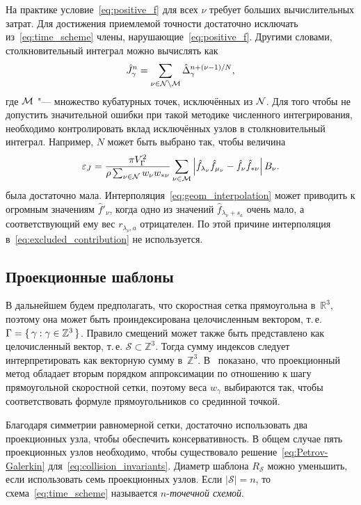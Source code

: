 На практике условие~\eqref{eq:positive_f} для всех \(\nu\) требует больших вычислительных затрат.
Для достижения приемлемой точности достаточно исключать из~\eqref{eq:time_scheme} члены,
нарушающие~\eqref{eq:positive_f}. Другими словами, столкновительный интеграл можно вычислять как
\begin{equation}\label{eq:discrete_short_ci_discarded}
    \hat{J}_\gamma^n = \sum_{\nu\in\mathcal{N}\setminus\mathcal{M}} \hat{\Delta}_\gamma^{n+(\nu-1)/N},
\end{equation}
где \(\mathcal{M}\) "--- множество кубатурных точек, исключённых из \(\mathcal{N}\).
Для того чтобы не допустить значительной ошибки при такой методике численного интегрирования,
необходимо контролировать вклад исключённых узлов в столкновительный интеграл.
Например, \(N\) может быть выбрано так, чтобы величина
\begin{equation}\label{eq:excluded_contribution}
    \varepsilon_J = \frac{\pi V_\Gamma^2}{\rho\sum_{\nu\in\mathcal{N}} w_{\nu}w_{*\nu}}
        \sum_{\nu\in\mathcal{M}} \left|
            \hat{f}_{\lambda_\nu}\hat{f}_{\mu_\nu} - \hat{f}_{\nu}\hat{f}_{*\nu}
        \right|B_\nu.
\end{equation}
была достаточно мала.
Интерполяция~\eqref{eq:geom_interpolation} может приводить к огромным значениям \(\hat{f}'_{\nu}\),
когда одно из значений \(\hat{f}_{\lambda_\nu+s_a}\) очень мало,
а соответствующий ему вес \(r_{\lambda_\nu,a}\) отрицателен.
По этой причине интерполяция в~\eqref{eq:excluded_contribution} не используется.

\subsection{Проекционные шаблоны}

В дальнейшем будем предполагать, что скоростная сетка прямоугольна в~\(\mathbb{R}^3\),
поэтому она может быть проиндексирована целочисленным вектором, т.\,е. \(\Gamma = \{\,{\gamma}:{\gamma\in\mathbb{Z}^3}\,\}\).
Правило смещений может также быть представлено как целочисленный вектор, т.\,е. \(\mathcal{S}\subset\mathbb{Z}^3\).
Тогда сумму индексов следует интерпретировать как векторную сумму в~\(\mathbb{Z}^3\).
В~\cite{Anikin2012} показано, что проекционный метод обладает вторым порядком аппроксимации
по отношению к шагу прямоугольной скоростной сетки, поэтому веса \(w_\gamma\) выбираются так,
чтобы соответствовать формуле прямоугольников со срединной точкой.

Благодаря симметрии равномерной сетки,
достаточно использовать два проекционных узла, чтобы обеспечить консервативность.
В общем случае пять проекционных узлов необходимо,
чтобы существовало решение~\eqref{eq:Petrov-Galerkin} для~\eqref{eq:collision_invariants}.
Диаметр шаблона \(R_\mathcal{S}\) можно уменьшить, если использовать семь проекционных узлов.
Если \(|\mathcal{S}|=n\), то схема~\eqref{eq:time_scheme} называется \(n\)-\emph{точечной схемой}.


